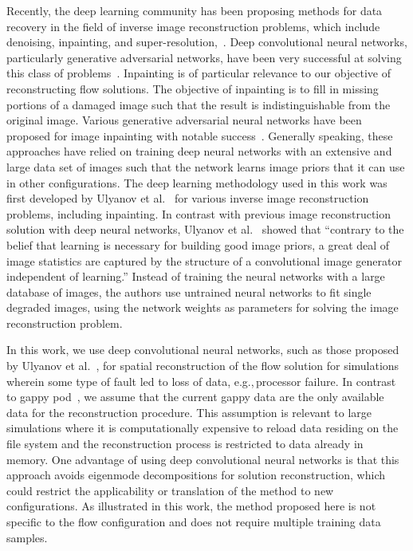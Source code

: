 \documentclass[review]{elsarticle}
\begin{document}
Recently, the deep learning community has been proposing methods for
data recovery in the field of inverse image reconstruction problems,
which include denoising, inpainting, and
super-resolution,~\cite{Goodfellow2014,Burger2012,Dosovitskiy2015,Lefkimmiatis2016,Ledig2017,Tai2017,Lai2017}. Deep
convolutional neural networks, particularly generative adversarial
networks, have been very successful at solving this class of
problems~\cite{Goodfellow2014}. Inpainting is of particular relevance
to our objective of reconstructing flow solutions. The objective of
inpainting is to fill in missing portions of a damaged image such that
the result is indistinguishable from the original image. Various
generative adversarial neural networks have been proposed for image
inpainting with notable
success~\cite{Yeh2016,Denton2016,Pathak2016,Li2017a,Sasaki2017}. Generally
speaking, these approaches have relied on training deep neural
networks with an extensive and large data set of images such that the
network learns image priors that it can use in other
configurations. The deep learning methodology used in this work was
first developed by Ulyanov et al.~\cite{Ulyanov2017} for various
inverse image reconstruction problems, including inpainting. In
contrast with previous image reconstruction solution with deep neural
networks, Ulyanov et al.~\cite{Ulyanov2017} showed that ``contrary to
the belief that learning is necessary for building good image priors,
a great deal of image statistics are captured by the structure of a
convolutional image generator independent of learning.''  Instead of
training the neural networks with a large database of images, the
authors use untrained neural networks to fit single degraded images,
using the network weights as parameters for solving the image
reconstruction problem.

In this work, we use deep convolutional neural networks, such as those
proposed by Ulyanov et al.~\cite{Ulyanov2017}, for spatial reconstruction of the flow
solution for simulations wherein some type of fault led to loss of
data, e.g.,\,processor failure. In contrast to gappy
\gls{pod}~\cite{Venturi2004}, we assume that the current gappy data are
the only available data for the reconstruction procedure. This
assumption is relevant to large simulations where it is
computationally expensive to reload data residing on the file system
and the reconstruction process is restricted to data already in
memory. One advantage of using deep convolutional neural networks is
that this approach avoids eigenmode decompositions for solution
reconstruction, which could restrict the applicability or translation of
the method to new configurations. As illustrated in this work, the
method proposed here is not specific to the flow configuration and
does not require multiple training data samples.
\end{document}
